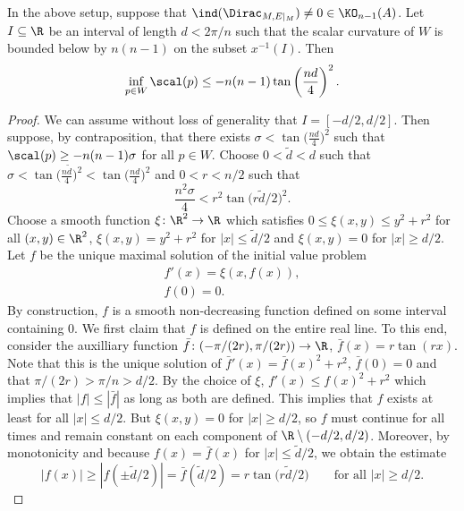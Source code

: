 \begin{Theorem}\label{thm:quantitative-codim-1}
 In the above setup, suppose that \(\ind(\Dirac_{M, E|_M}) \neq 0 \in \KO_{n-1}(A)\).
 Let \(I \subseteq \R\) be an interval of length \(d < 2 \pi / n\) such that the scalar curvature of \(W\) is bounded below by \(n(n-1)\) on the subset \(x^{-1}(I)\).
 Then
 \begin{equation*}
 \inf_{p \in W} \scal(p) \leq - n(n-1) \tan\left(\frac{nd}{4}\right)^2.
 \end{equation*}
 \end{Theorem}
 \begin{proof}
 We can assume without loss of generality that \(I = [-d/2,d/2]\).
 Then suppose, by contraposition, that there exists \(\sigma < \tan\big(\frac{nd}{4}\big)^2\) such that \(\scal(p) \geq -n(n-1) \sigma\) for all \(p \in W\).
 Choose \(0 < \tilde{d} < d\) such that \(\sigma < \tan\big(\frac{n\tilde{d}}{4}\big)^2 < \tan\big(\frac{nd}{4}\big)^2\) and \(0 < r < n/2\) such that
 \begin{equation}
 \frac{n^2 \sigma}{4} < r^2 \tan\big(r\tilde{d}/2\big)^2. \label{eq:choose-r}
 \end{equation}
 Choose a smooth function \(\xi \colon \R^2 \to \R\) which satisfies \(0 \leq \xi(x,y) \leq y^2 + r^2\) for all \((x,y) \in \R^2\), \(\xi(x,y) = y^2 + r^2\) for \(|x| \leq \tilde{d}/2\) and \(\xi(x,y) = 0\) for \(|x| \geq d/2\).
 Let \(f\) be the unique maximal solution of the initial value problem
 \begin{gather*}
 f'(x) = \xi(x,f(x)), \\
 f(0) = 0.
 \end{gather*}
 By construction, \(f\) is a smooth non-decreasing function defined on some interval containing \(0\).
 We first claim that \(f\) is defined on the entire real line.
 To this end, consider the auxilliary function \(\bar{f} \colon (-\pi/(2 r), \pi/(2r)) \to \R\), \(\bar{f}(x) = r \tan(r x)\).
 Note that this is the unique solution of \(\bar{f}'(x)= \bar{f}(x)^2 + r^2\), \(\bar{f}(0) = 0\) and that \(\pi/(2r) > \pi /n > d/2\).
 By the choice of \(\xi\), \(f'(x) \leq f(x)^2 + r^2\) which implies that \(|f| \leq |\bar{f}|\) as long as both are defined.
 This implies that \(f\) exists at least for all \(|x| \leq d/2\).
 But \(\xi(x,y) = 0\) for \(|x| \geq d/2\), so \(f\) must continue for all times and remain constant on each component of \(\R \setminus (-d/2,d/2)\).
 Moreover, by monotonicity and because \(f(x) = \bar{f}(x)\) for \(|x| \leq \tilde{d}/2\), we obtain the estimate
 \begin{equation}
 |f(x)| \geq |f(\pm \tilde{d}/2)| = \bar{f}(\tilde{d}/2) = r \tan\big(r \tilde{d} / 2\big) \qquad \text{for all \(|x| \geq d/2\).}
 \label{eq:outside-bound}
 \end{equation}


\end{proof}
